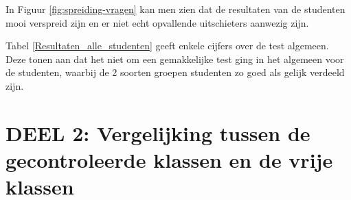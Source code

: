 In Figuur \ref{fig:spreiding-vragen} kan men zien dat de resultaten van de studenten mooi verspreid zijn en er niet echt opvallende uitschieters aanwezig zijn.

\begin{table}[]
	\centering
	\caption{Samenvatting resultaten alle geteste studenten}
	\label{Resultaten_alle_studenten}
\end{table}

Tabel \ref{Resultaten_alle_studenten} geeft enkele cijfers over de test algemeen. Deze tonen aan dat het niet om een gemakkelijke test ging in het algemeen voor de studenten, waarbij de 2 soorten groepen studenten zo goed als gelijk verdeeld zijn.

\section{DEEL 2: Vergelijking tussen de gecontroleerde klassen en de vrije klassen}
\label{sec:vragen_res2}

